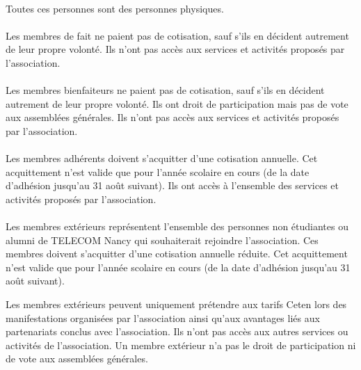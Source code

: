 \documentclass{article} %
\begin{document}
            \paragraph{}
			Toutes ces personnes sont des personnes physiques. 
			
			\paragraph{}
			Les membres de fait ne paient pas de cotisation, sauf s’ils
			en décident autrement de leur propre volonté. Ils n’ont pas
			accès aux services et activités proposés par l’association.

            \paragraph{}
			Les membres bienfaiteurs ne paient pas de cotisation, sauf s’ils en
			décident autrement de leur propre volonté. Ils ont droit de
			participation mais pas de vote aux assemblées générales. Ils n’ont
			pas accès aux services et activités proposés par l’association.

            \paragraph{}
			Les membres adhérents doivent s’acquitter d’une cotisation annuelle.
			Cet acquittement n’est valide que pour l’année scolaire en cours
			(de la date d’adhésion jusqu’au 31 août suivant). Ils ont accès à
			l’ensemble des services et activités proposés par l’association.

            \paragraph{}
			Les membres extérieurs représentent l’ensemble des personnes non
			étudiantes ou alumni de TELECOM Nancy qui souhaiterait rejoindre
			l’association. Ces membres doivent s’acquitter d’une cotisation
			annuelle réduite. Cet acquittement n’est valide que pour l’année
			scolaire en cours (de la date d’adhésion jusqu’au 31 août suivant).

			Les membres extérieurs peuvent uniquement prétendre aux tarifs Ceten
			lors des manifestations organisées par l’association ainsi qu’aux
			avantages liés aux partenariats conclus avec l’association. Ils
			n’ont pas accès aux autres services ou activités de l’association.
			Un membre extérieur n’a pas le droit de participation ni de vote aux
			assemblées générales.
\end{document}
